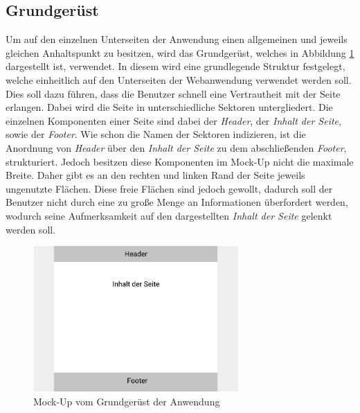\subsection{Grundgerüst}

Um auf den einzelnen Unterseiten der Anwendung einen allgemeinen und jeweils gleichen Anhaltspunkt zu besitzen, wird das Grundgerüst, welches in Abbildung \ref{fig:MockGrundgeruest} dargestellt ist, verwendet.
In diesem wird eine grundlegende Struktur festgelegt, welche einheitlich auf den Unterseiten der Webanwendung verwendet werden soll.
Dies soll dazu führen, dass die Benutzer schnell eine Vertrautheit mit der Seite erlangen.
Dabei wird die Seite in unterschiedliche Sektoren untergliedert.
Die einzelnen Komponenten einer Seite sind dabei der \emph{Header}, der \emph{Inhalt der Seite}, sowie der \emph{Footer}.
Wie schon die Namen der Sektoren indizieren, ist die Anordnung von \emph{Header} über den \emph{Inhalt der Seite} zu dem abschließenden \emph{Footer}, strukturiert.
Jedoch besitzen diese Komponenten im Mock-Up nicht die maximale Breite.
Daher gibt es an den rechten und linken Rand der Seite jeweils ungenutzte Flächen.
Diese freie Flächen sind jedoch gewollt, dadurch soll der Benutzer nicht durch eine zu große Menge an Informationen überfordert werden, wodurch seine Aufmerksamkeit auf den dargestellten \emph{Inhalt der Seite} gelenkt werden soll.

\begin{figure}[H]
	\centering
	\includegraphics[width=0.7\textwidth]{img/konzeption/client/grundgeruest}
	\captionsetup{justification=centering, format=plain}
	\caption[Mock-Up vom Grundgerüst der Anwendung]{Mock-Up vom Grundgerüst der Anwendung \\\figma}
	\label{fig:MockGrundgeruest}
\end{figure}
